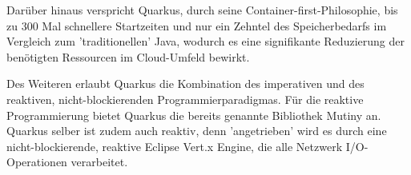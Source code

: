 Darüber hinaus verspricht Quarkus, durch seine Container-first-Philosophie, bis zu 300 Mal schnellere Startzeiten und nur ein Zehntel des
Speicherbedarfs im Vergleich zum 'traditionellen' Java, wodurch es eine signifikante Reduzierung der benötigten Ressourcen im Cloud-Umfeld bewirkt.

Des Weiteren erlaubt Quarkus die Kombination des imperativen und des reaktiven, nicht-blockierenden Programmierparadigmas.
Für die reaktive Programmierung bietet Quarkus die bereits genannte Bibliothek Mutiny an.
Quarkus selber ist zudem auch reaktiv, denn 'angetrieben' wird es durch eine nicht-blockierende, reaktive Eclipse Vert.x Engine, die
alle Netzwerk I/O-Operationen verarbeitet. \parencite{QuarkusReactiveGettingStarted, Quarkus}
